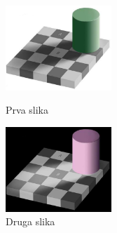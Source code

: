 ﻿\documentclass{article}
\begin{document}
\renewcommand{\figurename}{Slika}
\begin{figure}
\centering
\begin{minipage}[t]{0.33\textwidth}
\centering
\includegraphics[width=4cm]{pr_po_4a.eps}
\caption{Prva slika}
\end{minipage}
\begin{minipage}[t]{0.33\textwidth}
\centering
\includegraphics[width=4cm]{pr_po_4b.eps}
\caption{Druga slika}
\end{minipage}
\end{figure}
\end{document}
